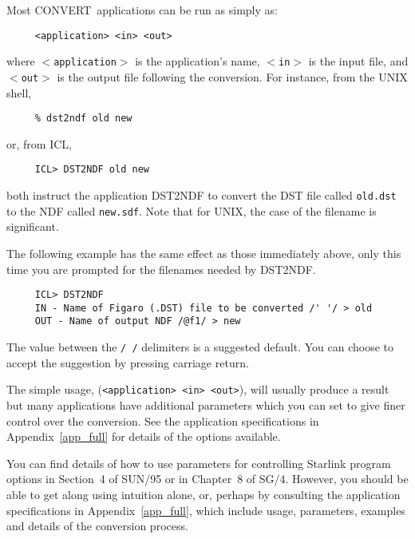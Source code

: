 \documentclass[twoside,11pt]{article}
\newcommand{\htmlref}[2]{#1}
\newcommand{\latex}[1]{#1}
\newcommand{\xref}[3]{#1}
\newcommand{\latexelsehtml}[2]{#1}
\newcommand{\latexelsehtml}[2]{#2}
\newcommand{\CONVERT}{{\footnotesize CONVERT}}
\begin{document}
Most \CONVERT\ applications can be run as simply as:

\small
\begin{verbatim}
     <application> <in> <out>
\end{verbatim}
\normalsize
where \texttt{$<$application$>$} is the application's name, \texttt{$<$in$>$}
is the input file, and \texttt{$<$out$>$} is the output
file following the conversion.  For instance, from the UNIX shell,

\small
\begin{verbatim}
     % dst2ndf old new
\end{verbatim}
\normalsize
or, from ICL,

\small
\begin{verbatim}
     ICL> DST2NDF old new
\end{verbatim}
\normalsize
both instruct the application \htmlref{DST2NDF}{DST2NDF} to convert the
DST file called \texttt{old.dst} to the NDF called \texttt{new.sdf}.  
Note that for UNIX, the case of the filename is significant.

The following example has the same effect as those immediately above,
only this time you are prompted for the filenames needed by DST2NDF. 

\small
\begin{verbatim}
     ICL> DST2NDF
     IN - Name of Figaro (.DST) file to be converted /' '/ > old
     OUT - Name of output NDF /@f1/ > new
\end{verbatim}
\normalsize
The value between the \texttt{/ /} delimiters is a suggested default.  You
can choose to accept the suggestion by pressing carriage return. 

The simple usage, (\texttt{<application> <in> <out>}), will usually produce a
result but many applications have additional parameters which you can set to
give finer control over the conversion. See the 
\htmlref{application specifications}{app_full}
\latex{in Appendix~\ref{app_full}} for details of the options available.

You can find details of how to use parameters for controlling Starlink program
options
\latexelsehtml{in Section~4 of SUN/95}{\xref{in SUN/95}{sun95}{se_param}}
or in
\latexelsehtml{Chapter~8}{section `Specifying Parameter Values'}
of 
\xref{SG/4}{sg4}{}.
However, you should be able to get along using intuition alone, or, perhaps 
by consulting the
\htmlref{application specifications}{app_full} 
\latex{in Appendix~\ref{app_full}}, which include usage, parameters,
examples and details of the conversion process.
\end{document}
